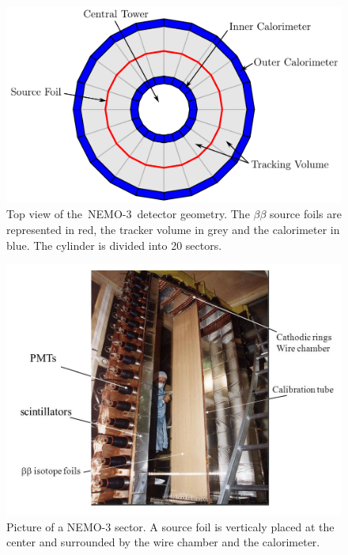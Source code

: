 \documentclass[main.tex]{subfiles}
\begin{document}
\begin{figure}[h!]
\begin{center}
\includegraphics[scale=0.35]{pictures/Chap2/TopViewNEMO3.png}
\caption{Top view of the~NEMO-3~detector geometry. The $\beta\beta$ source foils are represented in red, the tracker volume in grey and the calorimeter in blue. The cylinder is divided into 20 sectors.}
\label{TopViewNEMO3}
\end{center}
\end{figure}

\begin{figure}[h!]
\begin{center}
\includegraphics[scale=0.65]{pictures/Chap2/sector.jpg}
\caption{Picture of a NEMO-3 sector. A source foil is verticaly placed at the center and surrounded by the wire chamber and the calorimeter.}
\label{NEMO3SectorPictures}
\end{center}
\end{figure}
\end{document}
